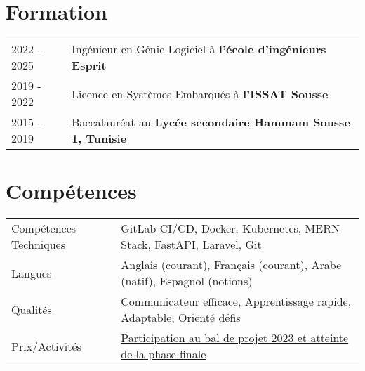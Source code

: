 \documentclass[a4paper,11pt]{article}
\begin{document}
\vspace{-8pt}
\section{Formation}
\begin{tabularx}{\linewidth}{@{}l X@{}}	
2022 - 2025 & Ingénieur en Génie Logiciel à \textbf{l'école d'ingénieurs Esprit} \\

2019 - 2022 & Licence en Systèmes Embarqués à \textbf{l'ISSAT Sousse} \\ 

2015 - 2019 & Baccalauréat au \textbf{Lycée secondaire Hammam Sousse 1, Tunisie} \\
\end{tabularx}


\section{Compétences}
\begin{tabularx}{\linewidth}{@{}l X@{}}
Compétences Techniques & \normalsize{GitLab CI/CD, Docker, Kubernetes, MERN Stack, FastAPI, Laravel, Git}\\
Langues & \normalsize{Anglais (courant), Français (courant), Arabe (natif), Espagnol (notions)}\\
Qualités & \normalsize{Communicateur efficace, Apprentissage rapide, Adaptable, Orienté défis}\\
Prix/Activités & \normalsize{\href{https://drive.google.com/file/d/16UhAiNxRB6kH4zVj_1JtAkfX1AmlOMHL/view}{Participation au bal de projet 2023 et atteinte de la phase finale}}\\
\end{tabularx}
\end{document}
